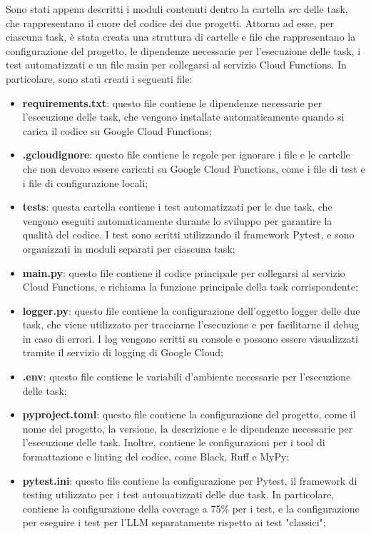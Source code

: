 Sono stati appena descritti i moduli contenuti dentro la cartella \emph{src} delle task, che rappresentano il cuore del codice dei due progetti. Attorno ad esse, per ciascuna task, è stata creata una struttura di cartelle e file che rappresentano la configurazione del progetto, le dipendenze necessarie per l'esecuzione delle task, i test automatizzati e un file main per collegarsi al servizio Cloud Functions. In particolare, sono stati creati i seguenti file:
\begin{itemize}
    \item \textbf{requirements.txt}: questo file contiene le dipendenze necessarie per l'esecuzione delle task, che vengono installate automaticamente quando si carica il codice su Google Cloud Functions;
    \item \textbf{.gcloudignore}: questo file contiene le regole per ignorare i file e le cartelle che non devono essere caricati su Google Cloud Functions, come i file di test e i file di configurazione locali;
    \item \textbf{tests}: questa cartella contiene i test automatizzati per le due task, che vengono eseguiti automaticamente durante lo sviluppo per garantire la qualità del codice. I test sono scritti utilizzando il framework Pytest, e sono organizzati in moduli separati per ciascuna task;
    \item \textbf{main.py}: questo file contiene il codice principale per collegarsi al servizio Cloud Functions, e richiama la funzione principale della task corrispondente;
    \item \textbf{logger.py}: questo file contiene la configurazione dell'oggetto logger delle due task, che viene utilizzato per tracciarne l'esecuzione e per facilitarne il debug in caso di errori. I log vengono scritti su console e possono essere visualizzati tramite il servizio di logging di Google Cloud;
    \item \textbf{.env}: questo file contiene le variabili d'ambiente necessarie per l'esecuzione delle task;
    \item \textbf{pyproject.toml}: questo file contiene la configurazione del progetto, come il nome del progetto, la versione, la descrizione e le dipendenze necessarie per l'esecuzione delle task. Inoltre, contiene le configurazioni per i tool di formattazione e linting del codice, come Black, Ruff e MyPy;
    \item \textbf{pytest.ini}: questo file contiene la configurazione per Pytest, il framework di testing utilizzato per i test automatizzati delle due task. In particolare, contiene la configurazione della coverage a 75\% per i test, e la configurazione per eseguire i test per l'LLM separatamente rispetto ai test "classici";

\end{itemize}
